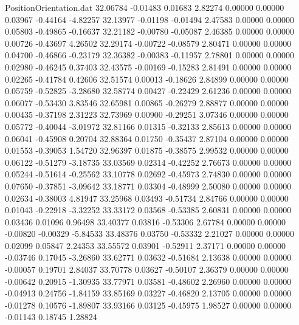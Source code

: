 \begin{filecontents}{PositionOrientation.dat}
  32.06784   -0.01483    0.01683     2.82274    0.00000    0.00000    0.03967   -0.44164   -4.82257
  32.13977   -0.01198   -0.01494     2.47583    0.00000    0.00000    0.05803   -0.49865   -0.16637
  32.21182   -0.00780   -0.05087     2.46385    0.00000    0.00000    0.00726   -0.43697    4.26502
  32.29174   -0.00722   -0.08579     2.80471    0.00000    0.00000    0.04700   -0.46866   -0.23179
  32.36382   -0.00383   -0.11957     2.78801    0.00000    0.00000    0.02980   -0.46245    0.37403
  32.43575   -0.00169   -0.15283     2.81491    0.00000    0.00000    0.02265   -0.41784    0.42606
  32.51574    0.00013   -0.18626     2.84899    0.00000    0.00000    0.05759   -0.52825   -3.28680
  32.58774    0.00427   -0.22429     2.61236    0.00000    0.00000    0.06077   -0.53430    3.83546
  32.65981    0.00865   -0.26279     2.88877    0.00000    0.00000    0.00435   -0.37198    2.31223
  32.73969    0.00900   -0.29251     3.07346    0.00000    0.00000    0.05772   -0.40044   -3.01972
  32.81166    0.01315   -0.32133     2.85613    0.00000    0.00000    0.06041   -0.45908    0.20704
  32.88364    0.01750   -0.35437     2.87104    0.00000    0.00000    0.01553   -0.39053    1.54720
  32.96397    0.01875   -0.38575     2.99532    0.00000    0.00000    0.06122   -0.51279   -3.18735
  33.03569    0.02314   -0.42252     2.76673    0.00000    0.00000    0.05244   -0.51614   -0.25562
  33.10778    0.02692   -0.45973     2.74830    0.00000    0.00000    0.07650   -0.37851   -3.09642
  33.18771    0.03304   -0.48999     2.50080    0.00000    0.00000    0.02634   -0.38003    4.81947
  33.25968    0.03493   -0.51734     2.84766    0.00000    0.00000    0.01043   -0.22918   -3.32252
  33.33172    0.03568   -0.53385     2.60831    0.00000    0.00000    0.03436    0.01096    0.96498
  33.40377    0.03816   -0.53306     2.67784    0.00000    0.00000   -0.00820   -0.00329   -5.84533
  33.48376    0.03750   -0.53332     2.21027    0.00000    0.00000    0.02099    0.05847    2.24353
  33.55572    0.03901   -0.52911     2.37171    0.00000    0.00000   -0.03746    0.17045   -3.26860
  33.62771    0.03632   -0.51684     2.13638    0.00000    0.00000   -0.00057    0.19701    2.84037
  33.70778    0.03627   -0.50107     2.36379    0.00000    0.00000   -0.00642    0.20915   -1.30935
  33.77971    0.03581   -0.48602     2.26960    0.00000    0.00000   -0.04913    0.24756   -1.84159
  33.85169    0.03227   -0.46820     2.13705    0.00000    0.00000   -0.01278    0.10576   -1.89807
  33.93166    0.03125   -0.45975     1.98527    0.00000    0.00000   -0.01143    0.18745    1.28824

\end{filecontents}

